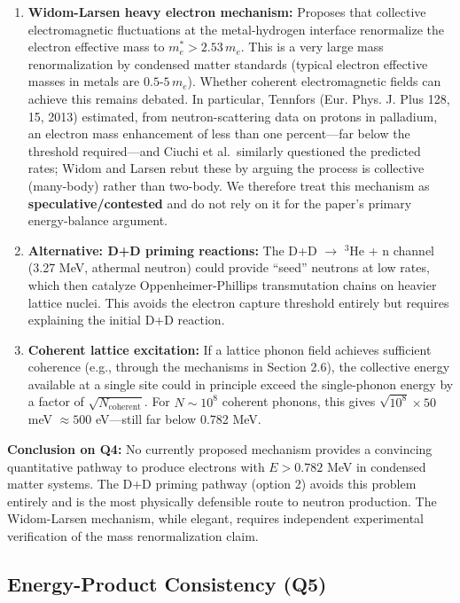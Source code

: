 \documentclass[11pt,a4paper]{article}
\begin{document}
\begin{enumerate}
\def\labelenumi{\arabic{enumi}.}
\item
  \textbf{Widom-Larsen heavy electron mechanism:} Proposes that collective electromagnetic fluctuations at the metal-hydrogen interface renormalize the electron effective mass to $m_e^* > 2.53 \, m_e$. This is a very large mass renormalization by condensed matter standards (typical electron effective masses in metals are $0.5\text{-}5 \, m_e$). Whether coherent electromagnetic fields can achieve this remains debated. In particular, Tennfors (Eur. Phys. J. Plus 128, 15, 2013) \citep{tennfors2013} estimated, from neutron-scattering data on protons in palladium, an electron mass enhancement of less than one percent---far below the threshold required---and Ciuchi et al.~similarly questioned the predicted rates; Widom and Larsen rebut these by arguing the process is collective (many-body) rather than two-body. We therefore treat this mechanism as \textbf{speculative/contested} and do not rely on it for the paper's primary energy-balance argument.
\item
  \textbf{Alternative: D+D priming reactions:} The D+D $\rightarrow$ $^{3}$He + n channel (3.27 MeV, athermal neutron) could provide ``seed'' neutrons at low rates, which then catalyze Oppenheimer-Phillips transmutation chains on heavier lattice nuclei. This avoids the electron capture threshold entirely but requires explaining the initial D+D reaction.
\item
  \textbf{Coherent lattice excitation:} If a lattice phonon field achieves sufficient coherence (e.g., through the mechanisms in Section 2.6), the collective energy available at a single site could in principle exceed the single-phonon energy by a factor of $\sqrt{N_{\text{coherent}}}$. For $N \sim 10^8$ coherent phonons, this gives $\sqrt{10^8} \times 50$ meV $\approx 500$ eV---still far below 0.782 MeV.
\end{enumerate}

\textbf{Conclusion on Q4:} No currently proposed mechanism provides a convincing quantitative pathway to produce electrons with $E > 0.782$ MeV in condensed matter systems. The D+D priming pathway (option 2) avoids this problem entirely and is the most physically defensible route to neutron production. The Widom-Larsen mechanism, while elegant, requires independent experimental verification of the mass renormalization claim.

\subsection{Energy-Product Consistency (Q5)}
\end{document}
